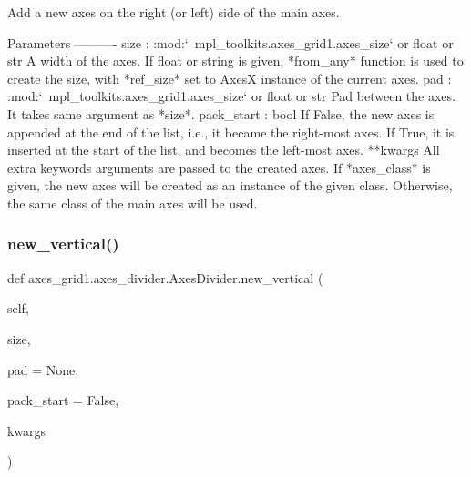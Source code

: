 \begin{DoxyVerb}Add a new axes on the right (or left) side of the main axes.

Parameters
----------
size : :mod:`~mpl_toolkits.axes_grid1.axes_size` or float or str
    A width of the axes. If float or string is given, *from_any*
    function is used to create the size, with *ref_size* set to AxesX
    instance of the current axes.
pad : :mod:`~mpl_toolkits.axes_grid1.axes_size` or float or str
    Pad between the axes. It takes same argument as *size*.
pack_start : bool
    If False, the new axes is appended at the end
    of the list, i.e., it became the right-most axes. If True, it is
    inserted at the start of the list, and becomes the left-most axes.
**kwargs
    All extra keywords arguments are passed to the created axes.
    If *axes_class* is given, the new axes will be created as an
    instance of the given class. Otherwise, the same class of the
    main axes will be used.
\end{DoxyVerb}
 \mbox{\label{classaxes__grid1_1_1axes__divider_1_1AxesDivider_a7adcf33e8b28807377decf7190612790}} 
\subsubsection{\texorpdfstring{new\+\_\+vertical()}{new\_vertical()}}
{\footnotesize\ttfamily def axes\+\_\+grid1.\+axes\+\_\+divider.\+Axes\+Divider.\+new\+\_\+vertical (\begin{DoxyParamCaption}\item[{}]{self,  }\item[{}]{size,  }\item[{}]{pad = {\ttfamily None},  }\item[{}]{pack\+\_\+start = {\ttfamily False},  }\item[{}]{kwargs }\end{DoxyParamCaption})}

